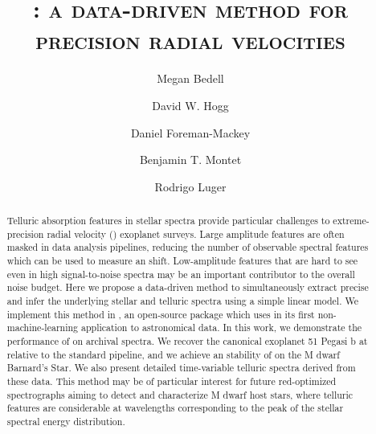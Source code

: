\documentclass[modern]{aastex62}
\newcommand{\Mdwarf}{Barnard's Star\xspace} %
\begin{document}
\sloppy\sloppypar\raggedbottom\frenchspacing %

\shorttitle{\wobble}

\graphicspath{ {figures/} }

\title{\textsc{\wobble: a data-driven method for precision radial velocities}}

\author[0000-0001-9907-7742]{Megan Bedell}
\affiliation{\flatiron}

\author[0000-0003-2866-9403]{David W. Hogg}
\affiliation{\flatiron}

\author{Daniel Foreman-Mackey}
\affiliation{\flatiron}

\author[0000-0001-7516-8308]{Benjamin T. Montet}
\affiliation{\chicago}

\author{Rodrigo Luger}
\affiliation{\flatiron}


\begin{abstract}
Telluric absorption features in stellar spectra provide particular challenges to extreme-precision radial velocity (\EPRV) exoplanet surveys. 
Large amplitude features are often masked in data analysis pipelines, reducing the number of observable spectral features which can be used to measure an \RV shift.
Low-amplitude features that are hard to see even in high signal-to-noise spectra may be an important contributor to the overall \RV noise budget.
Here we propose a data-driven method to simultaneously extract precise \RVs and infer the underlying stellar and telluric spectra using a simple linear model. 
We implement this method in \wobble, an open-source \python package which uses \TF in its first non-machine-learning application to astronomical data. 
In this work, we demonstrate the performance of \wobble on archival \HARPS spectra.
We recover the canonical exoplanet 51 Pegasi b at  relative to the standard \HARPS pipeline, and we achieve an \RV stability of  \ms on the M dwarf \Mdwarf. 
We also present detailed time-variable telluric spectra derived from these data. 
This method may be of particular interest for future red-optimized spectrographs aiming to detect and characterize M dwarf host stars, where telluric features are considerable at wavelengths corresponding to the peak of the stellar spectral energy distribution.  \end{abstract}
\end{document}
